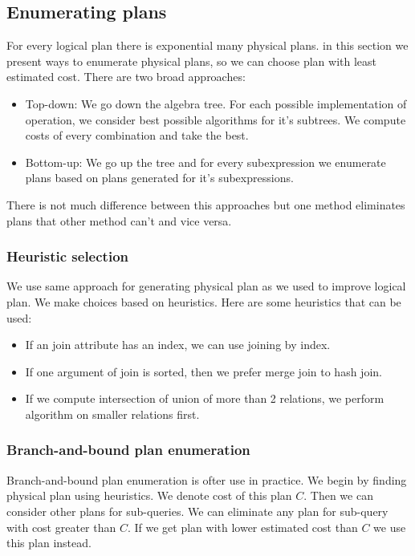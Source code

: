 \subsection{Enumerating plans}
For every logical plan there is exponential many physical plans. in this section we present ways to enumerate physical plans, so we can choose plan with least estimated cost. There are two broad approaches:
\begin{itemize}
\item Top-down: We go down the algebra tree. For each possible implementation of operation, we consider best possible algorithms for it's subtrees. We compute costs of every combination and take the best.
\item Bottom-up: We go up the tree and for every subexpression we enumerate plans based on plans generated for it's subexpressions.
\end{itemize}

There is not much difference between this approaches but one method eliminates plans that other method can't and vice versa.
\subsubsection{Heuristic selection}

We use same approach for generating physical plan as we used to improve logical plan. We make choices based on heuristics. Here are some heuristics that can be used:

\begin{itemize}

\item If an join attribute has an index, we can use joining by index.
\item If one argument of join is sorted, then we prefer merge join to hash join.
\item If we compute intersection of union of more than 2 relations, we perform algorithm on smaller relations first.
\end{itemize}

\subsubsection{Branch-and-bound plan enumeration}
Branch-and-bound plan enumeration is ofter use in practice. We begin by finding physical plan using heuristics. We denote cost of this plan $C$. Then we can consider other plans for sub-queries. We can eliminate any plan for sub-query with cost greater than $C$. If we get plan with lower estimated cost than $C$ we use this plan instead.

